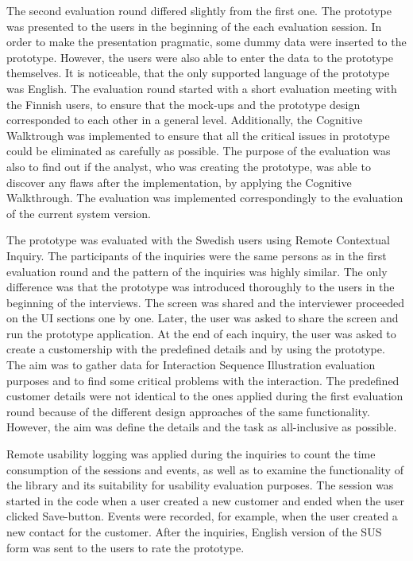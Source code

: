 \documentclass[12pt,a4paper,oneside,pdftex]{report}
\begin{document}
The second evaluation round differed slightly from the first one. The prototype was presented to the users in the beginning of the each evaluation session. In order to make the presentation pragmatic, some dummy data were inserted to the prototype. However, the users were also able to enter the data to the prototype themselves. It is noticeable, that the only supported language of the prototype was English. The evaluation round started with a short evaluation meeting with the Finnish users, to ensure that the mock-ups and the prototype design corresponded to each other in a general level. Additionally, the Cognitive Walktrough was implemented to ensure that all the critical issues in prototype could be eliminated as carefully as possible. The purpose of the evaluation was also to find out if the analyst, who was creating the prototype, was able to discover any flaws after the implementation, by applying the Cognitive Walkthrough. The evaluation was implemented correspondingly to the evaluation of the current system version. 

The prototype was evaluated with the Swedish users using Remote Contextual Inquiry. The participants of the inquiries were the same persons as in the first evaluation round and the pattern of the inquiries was highly similar. The only difference was that the prototype was introduced thoroughly to the users in the beginning of the interviews. The screen was shared and the interviewer proceeded on the UI sections one by one. Later, the user was asked to share the screen and run the prototype application. At the end of each inquiry, the user was asked to create a customership with the predefined details and by using the prototype. The aim was to gather data for Interaction Sequence Illustration evaluation purposes and to find some critical problems with the interaction. The predefined customer details were not identical to the ones applied during the first evaluation round because of the different design approaches of the same functionality. However, the aim was define the details and the task as all-inclusive as possible. 

Remote usability logging was applied during the inquiries to count the time consumption of the sessions and events, as well as to examine the functionality of the library and its suitability for usability evaluation purposes. The session was started in the code when a user created a new customer and ended when the user clicked Save-button. Events were recorded, for example, when the user created a new contact for the customer. After the inquiries, English version of the SUS form was sent to the users to rate the prototype.
\end{document}
